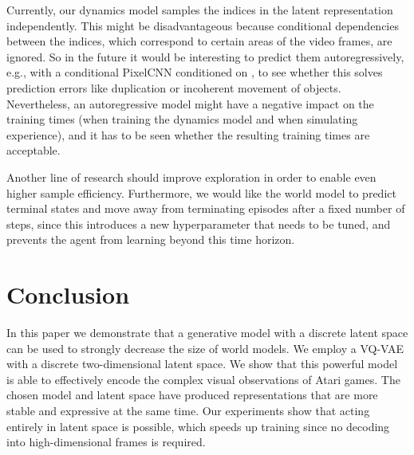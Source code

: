 \documentclass{article}
\begin{document}
Currently, our dynamics model samples the indices in the latent representation
independently. This might be disadvantageous because conditional dependencies
between the indices, which correspond to certain areas of the video frames, are
ignored. So in the future it would be interesting to predict them
autoregressively, e.g., with a conditional PixelCNN \citep{conditional-pixelcnn}
conditioned on , to see whether this solves prediction errors like
duplication or incoherent movement of objects. Nevertheless, an autoregressive
model might have a negative impact on the training times (when training the
dynamics model and when simulating experience), and it has to be seen whether
the resulting training times are acceptable.

Another line of research should improve exploration in order to enable even
higher sample efficiency. Furthermore, we would like the world model to predict
terminal states and move away from terminating episodes after a fixed number of
steps, since this introduces a new hyperparameter that needs to be tuned, and
prevents the agent from learning beyond this time horizon.

\section{Conclusion}

In this paper we demonstrate that a generative model with a discrete latent
space can be used to strongly decrease the size of world models. We employ a
VQ-VAE with a discrete two-dimensional latent space. We show that this powerful
model is able to effectively encode the complex visual observations of Atari
games. The chosen model and latent space have produced representations that are
more stable and expressive at the same time. Our experiments show that acting
entirely in latent space is possible, which speeds up training since no decoding
into high-dimensional frames is required.



\end{document}
